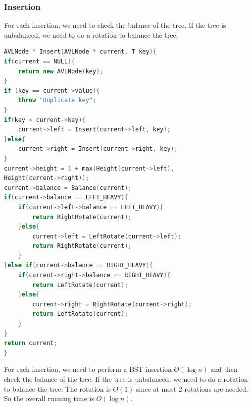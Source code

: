 \documentclass[letterpaper,12pt]{article}
\begin{document}
\subsubsection{Insertion}
For each insertion, we need to check the balance of the tree. If the tree is unbalanced, we need to do a rotation to balance the tree.

\begin{algorithmic}
    \Else 
        \EndIf
    \EndIf

        \EndIf
    \Else
        \EndIf
    \EndIf
\end{algorithmic}
\begin{lstlisting}[language=C++]
AVLNode * Insert(AVLNode * current, T key){
if(current == NULL){
    return new AVLNode(key);
}
if (key == current->value){
    throw "Duplicate key";
}
if(key < current->key){
    current->left = Insert(current->left, key);
}else{
    current->right = Insert(current->right, key);
}
current->height = 1 + max(Height(current->left), 
Height(current->right));
current->balance = Balance(current);
if(current->balance == LEFT_HEAVY){
    if(current->left->balance == LEFT_HEAVY){
        return RightRotate(current);
    }else{
        current->left = LeftRotate(current->left);
        return RightRotate(current);
    }
}else if(current->balance == RIGHT_HEAVY){
    if(current->right->balance == RIGHT_HEAVY){
        return LeftRotate(current);
    }else{
        current->right = RightRotate(current->right);
        return LeftRotate(current);
    }
}
return current;
}
\end{lstlisting}
For each insertion, we need to perform a BST insertion $O(\log n)$ and then check the balance of the tree. If the tree is unbalanced, we need to do a rotation to balance the tree. The rotation is $O(1)$ since at most 2 rotations are needed. So the overall running time is $O(\log n)$.
\end{document}

